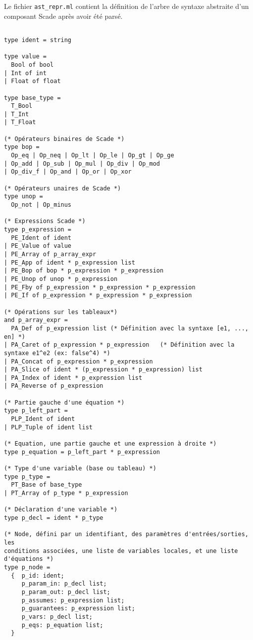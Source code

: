 \noindent
Le fichier \texttt{ast\_repr.ml} contient la définition de l'arbre de
syntaxe abstraite d'un composant Scade après avoir été parsé.
\begin{small}
\begin{verbatim}

type ident = string

type value =
  Bool of bool
| Int of int
| Float of float

type base_type =
  T_Bool
| T_Int
| T_Float

(* Opérateurs binaires de Scade *)
type bop =
  Op_eq | Op_neq | Op_lt | Op_le | Op_gt | Op_ge
| Op_add | Op_sub | Op_mul | Op_div | Op_mod
| Op_div_f | Op_and | Op_or | Op_xor

(* Opérateurs unaires de Scade *)
type unop =
  Op_not | Op_minus

(* Expressions Scade *)
type p_expression =
  PE_Ident of ident
| PE_Value of value
| PE_Array of p_array_expr
| PE_App of ident * p_expression list
| PE_Bop of bop * p_expression * p_expression
| PE_Unop of unop * p_expression
| PE_Fby of p_expression * p_expression * p_expression
| PE_If of p_expression * p_expression * p_expression

(* Opérations sur les tableaux*)
and p_array_expr =
  PA_Def of p_expression list (* Définition avec la syntaxe [e1, ..., en] *)
| PA_Caret of p_expression * p_expression   (* Définition avec la syntaxe e1^e2 (ex: false^4) *)
| PA_Concat of p_expression * p_expression
| PA_Slice of ident * (p_expression * p_expression) list
| PA_Index of ident * p_expression list
| PA_Reverse of p_expression

(* Partie gauche d'une équation *)
type p_left_part =
  PLP_Ident of ident
| PLP_Tuple of ident list

(* Equation, une partie gauche et une expression à droite *)
type p_equation = p_left_part * p_expression

(* Type d'une variable (base ou tableau) *)
type p_type =
  PT_Base of base_type
| PT_Array of p_type * p_expression

(* Déclaration d'une variable *)
type p_decl = ident * p_type

(* Node, défini par un identifiant, des paramètres d'entrées/sorties, les
conditions associées, une liste de variables locales, et une liste d'équations *)
type p_node =
  {  p_id: ident;
     p_param_in: p_decl list;
     p_param_out: p_decl list;
     p_assumes: p_expression list;
     p_guarantees: p_expression list;
     p_vars: p_decl list;
     p_eqs: p_equation list; 
  }

\end{verbatim}
\end{small}
